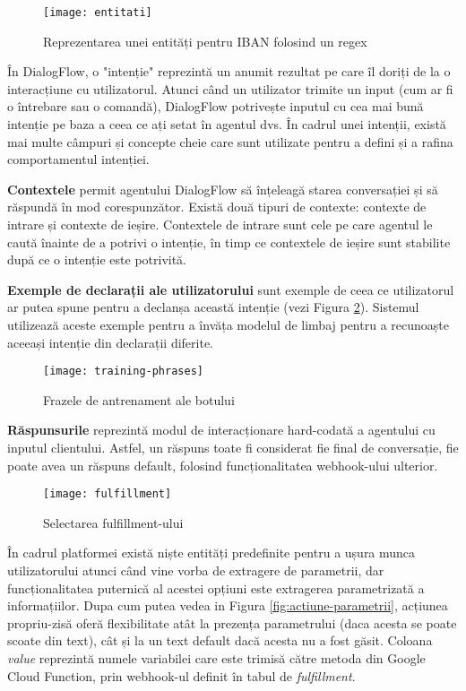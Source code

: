 \begin{figure}[h]
    \centering
    \texttt{[image: entitati]}
    \caption{Reprezentarea unei entități pentru IBAN folosind un regex}
    \label{fig:entitati}
\end{figure}

În DialogFlow, o "intenție" reprezintă un anumit rezultat pe care îl doriți de la o interacțiune cu utilizatorul. Atunci când un utilizator trimite un input (cum ar fi o întrebare sau o comandă), DialogFlow potrivește inputul cu cea mai bună intenție pe baza a ceea ce ați setat în agentul dvs. În cadrul unei intenții, există mai multe câmpuri și concepte cheie care sunt utilizate pentru a defini și a rafina comportamentul intenției.

\textbf{Contextele} permit agentului DialogFlow să înțeleagă starea conversației și să răspundă în mod corespunzător. Există două tipuri de contexte: contexte de intrare și contexte de ieșire. Contextele de intrare sunt cele pe care agentul le caută înainte de a potrivi o intenție, în timp ce contextele de ieșire sunt stabilite după ce o intenție este potrivită.

\textbf{Exemple de declarații ale utilizatorului} sunt exemple de ceea ce utilizatorul ar putea spune pentru a declanșa această intenție (vezi Figura \ref{fig:training-phrases}). Sistemul utilizează aceste exemple pentru a învăța modelul de limbaj pentru a recunoaște aceeași intenție din declarații diferite.

\begin{figure}[H]
    \centering
    \texttt{[image: training-phrases]}
    \caption{Frazele de antrenament ale botului}
    \label{fig:training-phrases}
\end{figure}

\textbf{Răspunsurile} reprezintă modul de interacționare hard-codată a agentului cu inputul clientului. Astfel, un răspuns toate fi considerat fie final de conversație, fie poate avea un răspuns default, folosind funcționalitatea webhook-ului ulterior.

\begin{figure}[H]
    \centering
    \texttt{[image: fulfillment]}
    \caption{Selectarea fulfillment-ului}
    \label{fig:fulfillment}
\end{figure}

În cadrul platformei există niște entități predefinite \cite{system-entities} pentru a ușura munca utilizatorului atunci când vine vorba de extragere de parametrii, dar funcționalitatea puternică al acestei opțiuni este extragerea parametrizată a informațiilor. Dupa cum putea vedea in Figura \ref{fig:actiune-parametrii}, acțiunea propriu-zisă oferă flexibilitate atât la prezența parametrului (daca acesta se poate scoate din text), cât și la un text default dacă acesta nu a fost găsit. Coloana \emph{value} reprezintă numele variabilei care este trimisă către metoda din Google Cloud Function, prin webhook-ul definit în tabul de \emph{fulfillment}.

